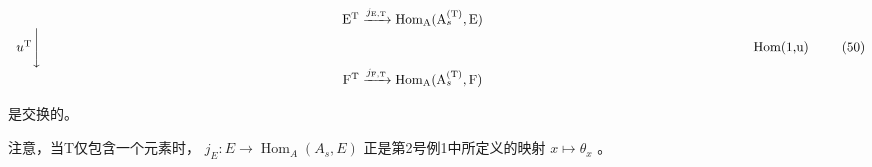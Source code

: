 \[
\begin{array}{c} \mathrm {E^ {T}} \xrightarrow {j _ {\mathrm{E,T}}} \operatorname{Hom} _ {\mathrm{A}} (\mathrm{A} _ {s} ^ {(\mathrm{T})}, \mathrm{E}) \\ u ^ {\mathrm{T}} \Biggl \downarrow \qquad \qquad \qquad \qquad \qquad \qquad \qquad \qquad \qquad \qquad \qquad \qquad \qquad \qquad \qquad \qquad \qquad \qquad \qquad \qquad \qquad \qquad \qquad \qquad \qquad \qquad \qquad \text {Hom(1,u)} \\ \mathrm {F^ {T}} \xrightarrow {j _ {\mathrm{F,T}}} \operatorname{Hom} _ {\mathrm{A}} (\mathrm{A} _ {s} ^ {(\mathrm{T})}, \mathrm{F}) \end{array}\tag{50}
\]

是交换的。

注意，当T仅包含一个元素时， \(j_{E}:E \to \operatorname{Hom}_{A}(A_{s}, E)\) 正是第2号例1中所定义的映射 \(x \mapsto \theta_{x}\) 。

